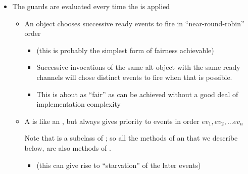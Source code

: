 \documentclass{concdistfoils}
\begin{document}
\begin{slide}
\begin{itemize}
\item The guards are evaluated every time the  is applied
\vfill
\begin{itemize}
\item An  object chooses successive ready events to fire in 
      ``near-round-robin'' order
\begin{itemize}
\item (this is probably the simplest form of fairness achievable)
\end{itemize}
\begin{note}
\begin{itemize}
\item Successive invocations of the same alt object with the 
      same ready channels will chose distinct events 
      to fire when that is possible.
\item This is about as ``fair'' as can be achieved without a good
      deal of implementation complexity
\end{itemize}
\end{note}
\vfill
\vfill
\item A  is like an , but always gives priority to events in
      order $ev_1, ev_2, ... ev_n$
\begin{note}
Note that  is a subclass of ; so all the methods of
an  that we describe below, are also methods of .
\end{note}
\begin{itemize}
\item (this can give rise to ``starvation'' of the later events)
\end{itemize}
\end{itemize}
\end{itemize}
\end{slide}
\end{document}

